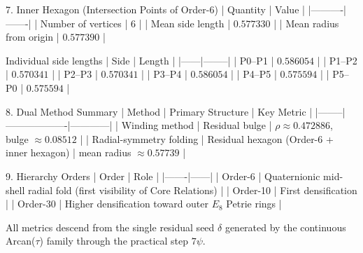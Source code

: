 7. Inner Hexagon (Intersection Points of Order-6)
| Quantity | Value |
|----------|-------|
| Number of vertices | 6 |
| Mean side length | \(0.577330\) |
| Mean radius from origin | \(0.577390\) |

Individual side lengths 
| Side | Length |
|------|--------|
| P0–P1 | \(0.586054\) |
| P1–P2 | \(0.570341\) |
| P2–P3 | \(0.570341\) |
| P3–P4 | \(0.586054\) |
| P4–P5 | \(0.575594\) |
| P5–P0 | \(0.575594\) |

8. Dual Method Summary
| Method | Primary Structure | Key Metric |
|--------|-------------------|------------|
| Winding method | Residual bulge | \(\rho \approx 0.472886\), bulge \(\approx 0.08512\) |
| Radial-symmetry folding | Residual hexagon (Order-6 + inner hexagon) | mean radius \(\approx 0.57739\) |

9. Hierarchy Orders
| Order | Role |
|-------|------|
| Order-6 | Quaternionic mid-shell radial fold (first visibility of Core Relations) |
| Order-10 | First densification |
| Order-30 | Higher densification toward outer \(E_8\) Petrie rings |

All metrics descend from the single residual seed \(\delta\) generated by the continuous Arcan(\(\tau\)) family through the practical step \(7\psi\). 
